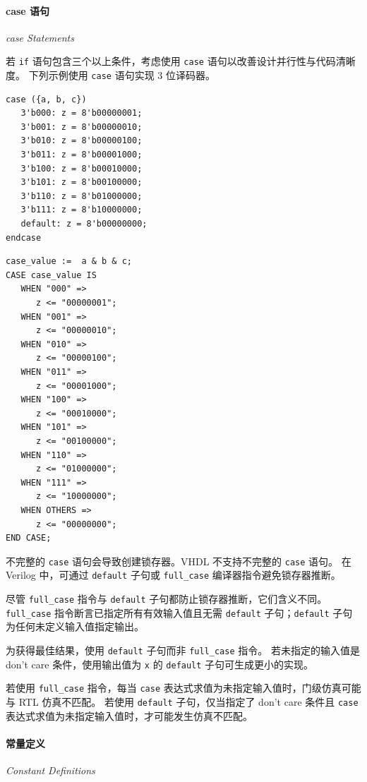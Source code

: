 \paragraph{case 语句}
\textit{case Statements}

若 \texttt{if} 语句包含三个以上条件，考虑使用 \texttt{case} 语句以改善设计并行性与代码清晰度。
下列示例使用 \texttt{case} 语句实现 3 位译码器。

\begin{lstlisting}[caption={使用 case 语句（Verilog）},label=ex:case-v]
case ({a, b, c})
   3'b000: z = 8'b00000001;
   3'b001: z = 8'b00000010;
   3'b010: z = 8'b00000100;
   3'b011: z = 8'b00001000;
   3'b100: z = 8'b00010000;
   3'b101: z = 8'b00100000;
   3'b110: z = 8'b01000000;
   3'b111: z = 8'b10000000;
   default: z = 8'b00000000;
endcase
\end{lstlisting}

\begin{lstlisting}[caption={使用 case 语句（VHDL）},label=ex:case-vhdl]
case_value :=  a & b & c;
CASE case_value IS
   WHEN "000" =>
      z <= "00000001";
   WHEN "001" =>
      z <= "00000010";
   WHEN "010" =>
      z <= "00000100";
   WHEN "011" =>
      z <= "00001000";
   WHEN "100" =>
      z <= "00010000";
   WHEN "101" =>
      z <= "00100000";
   WHEN "110" =>
      z <= "01000000";
   WHEN "111" =>
      z <= "10000000";
   WHEN OTHERS =>
      z <= "00000000";
END CASE;
\end{lstlisting}

不完整的 \texttt{case} 语句会导致创建锁存器。VHDL 不支持不完整的 \texttt{case} 语句。
在 Verilog 中，可通过 \texttt{default} 子句或 \texttt{full\_case} 编译器指令避免锁存器推断。

尽管 \texttt{full\_case} 指令与 \texttt{default} 子句都防止锁存器推断，它们含义不同。
\texttt{full\_case} 指令断言已指定所有有效输入值且无需 \texttt{default} 子句；\texttt{default} 子句为任何未定义输入值指定输出。

为获得最佳结果，使用 \texttt{default} 子句而非 \texttt{full\_case} 指令。
若未指定的输入值是 don't care 条件，使用输出值为 \texttt{x} 的 \texttt{default} 子句可生成更小的实现。

若使用 \texttt{full\_case} 指令，每当 \texttt{case} 表达式求值为未指定输入值时，门级仿真可能与 RTL 仿真不匹配。
若使用 \texttt{default} 子句，仅当指定了 don't care 条件且 \texttt{case} 表达式求值为未指定输入值时，才可能发生仿真不匹配。

\paragraph{常量定义}
\textit{Constant Definitions}

